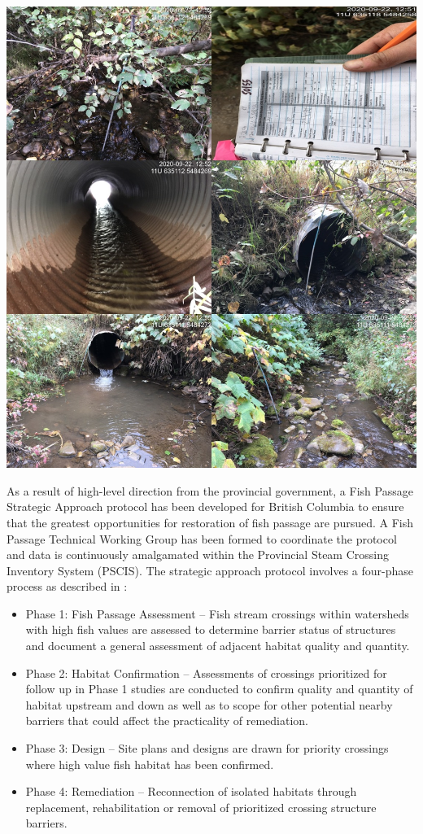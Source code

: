 \documentclass[
]{book}
\providecommand{\tightlist}{%
  \setlength{\itemsep}{0pt}\setlength{\parskip}{0pt}}
\begin{document}
\includegraphics[width=15.56in]{data/photos/50155/crossing_all}

As a result of high-level direction from the provincial government, a Fish Passage Strategic Approach protocol has been developed for British Columbia to ensure that the greatest opportunities for restoration of fish passage are pursued. A Fish Passage Technical Working Group has been formed to coordinate the protocol and data is continuously amalgamated within the Provincial Steam Crossing Inventory System (PSCIS). The strategic approach protocol involves a four-phase process as described in \citet{fishpassagetechnicalworkinggroupFishPassageStrategic2014} :

\begin{itemize}
\tightlist
\item
  Phase 1: Fish Passage Assessment -- Fish stream crossings within watersheds with high fish values are assessed to determine barrier status of structures and document a general assessment of adjacent habitat quality and quantity.
\item
  Phase 2: Habitat Confirmation -- Assessments of crossings prioritized for follow up in Phase 1 studies are conducted to confirm quality and quantity of habitat upstream and down as well as to scope for other potential nearby barriers that could affect the practicality of remediation.
\item
  Phase 3: Design -- Site plans and designs are drawn for priority crossings where high value fish habitat has been confirmed.
\item
  Phase 4: Remediation -- Reconnection of isolated habitats through replacement, rehabilitation or removal of prioritized crossing structure barriers.
\end{itemize}
\end{document}

